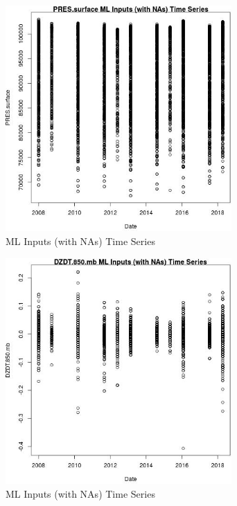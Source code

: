 \begin{figure} 
\centering  
\includegraphics[width=0.77\textwidth]{Code_Outputs/Report_ML_input_PM25_Step4_part_e_de_duplicated_aves_compiled_2019-05-18wNAs_PRESsurfacevDate.jpg} 
\caption{\label{fig:Report_ML_input_PM25_Step4_part_e_de_duplicated_aves_compiled_2019-05-18wNAsPRESsurfacevDate}ML Inputs (with NAs) Time Series} 
\end{figure} 
 

\begin{figure} 
\centering  
\includegraphics[width=0.77\textwidth]{Code_Outputs/Report_ML_input_PM25_Step4_part_e_de_duplicated_aves_compiled_2019-05-18wNAs_DZDT850mbvDate.jpg} 
\caption{\label{fig:Report_ML_input_PM25_Step4_part_e_de_duplicated_aves_compiled_2019-05-18wNAsDZDT850mbvDate}ML Inputs (with NAs) Time Series} 
\end{figure} 
 

